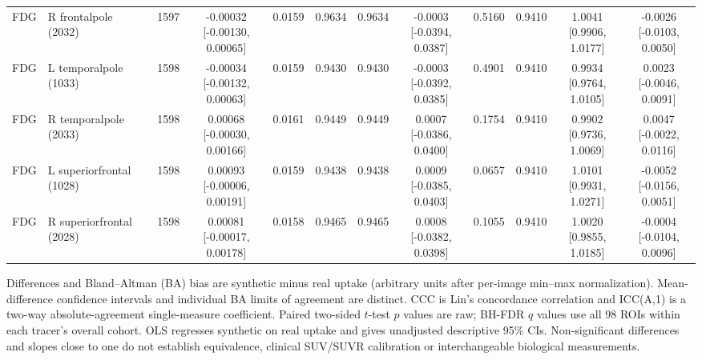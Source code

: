 \begin{landscape}
\begin{table}[p]
{\begin{tabular}{llrccccccccc}
FDG & R frontalpole (2032) & 1597 & \shortstack{-0.00032\\{}[-0.00130, 0.00065]} & 0.0159 & 0.9634 & 0.9634 & \shortstack{-0.0003\\{}[-0.0394, 0.0387]} & 0.5160 & 0.9410 & \shortstack{1.0041\\{}[0.9906, 1.0177]} & \shortstack{-0.0026\\{}[-0.0103, 0.0050]} \\
FDG & L temporalpole (1033) & 1598 & \shortstack{-0.00034\\{}[-0.00132, 0.00063]} & 0.0159 & 0.9430 & 0.9430 & \shortstack{-0.0003\\{}[-0.0392, 0.0385]} & 0.4901 & 0.9410 & \shortstack{0.9934\\{}[0.9764, 1.0105]} & \shortstack{0.0023\\{}[-0.0046, 0.0091]} \\
FDG & R temporalpole (2033) & 1598 & \shortstack{0.00068\\{}[-0.00030, 0.00166]} & 0.0161 & 0.9449 & 0.9449 & \shortstack{0.0007\\{}[-0.0386, 0.0400]} & 0.1754 & 0.9410 & \shortstack{0.9902\\{}[0.9736, 1.0069]} & \shortstack{0.0047\\{}[-0.0022, 0.0116]} \\
FDG & L superiorfrontal (1028) & 1598 & \shortstack{0.00093\\{}[-0.00006, 0.00191]} & 0.0159 & 0.9438 & 0.9438 & \shortstack{0.0009\\{}[-0.0385, 0.0403]} & 0.0657 & 0.9410 & \shortstack{1.0101\\{}[0.9931, 1.0271]} & \shortstack{-0.0052\\{}[-0.0156, 0.0051]} \\
FDG & R superiorfrontal (2028) & 1598 & \shortstack{0.00081\\{}[-0.00017, 0.00178]} & 0.0158 & 0.9465 & 0.9465 & \shortstack{0.0008\\{}[-0.0382, 0.0398]} & 0.1055 & 0.9410 & \shortstack{1.0020\\{}[0.9855, 1.0185]} & \shortstack{-0.0004\\{}[-0.0104, 0.0096]} \\
\bottomrule
\end{tabular}}
\par\smallskip\footnotesize
Differences and Bland--Altman (BA) bias are synthetic minus real uptake (arbitrary units after per-image min--max normalization). Mean-difference confidence intervals and individual BA limits of agreement are distinct. CCC is Lin's concordance correlation and ICC(A,1) is a two-way absolute-agreement single-measure coefficient. Paired two-sided $t$-test $p$ values are raw; BH-FDR $q$ values use all 98 ROIs within each tracer's overall cohort. OLS regresses synthetic on real uptake and gives unadjusted descriptive 95\% CIs. Non-significant differences and slopes close to one do not establish equivalence, clinical SUV/SUVR calibration or interchangeable biological measurements.
\end{table}
\end{landscape}
